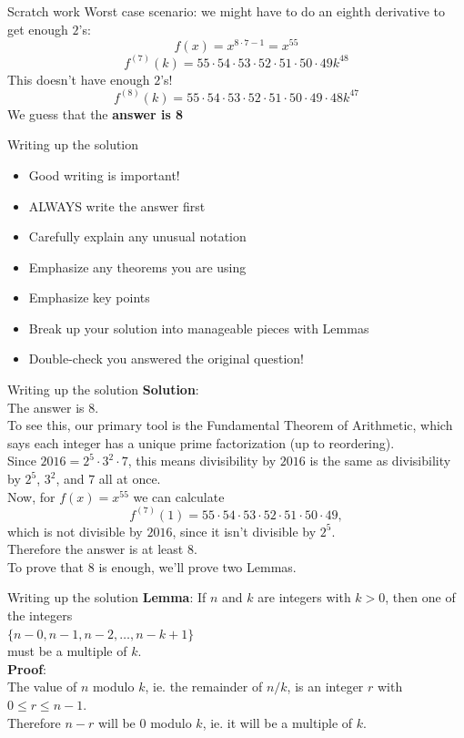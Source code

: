 \documentclass{beamer}
\begin{document}
\begin{frame}{Scratch work}
Worst case scenario: we might have to do an eighth derivative to get enough $2$'s:
\pause
$$f(x) = x^{8\cdot 7-1} = x^{55}$$
\pause
$$f^{(7)}(k) = 55\cdot 54\cdot 53\cdot 52\cdot 51\cdot 50\cdot 49 k^{48}$$
\pause
\hfil This doesn't have enough $2$'s!
\pause
$$f^{(8)}(k) = 55\cdot 54\cdot 53\cdot 52\cdot 51\cdot 50\cdot 49\cdot 48  k^{47}$$
\hfil We guess that the \textbf{answer is 8}
\end{frame}

\begin{frame}{Writing up the solution}
\begin{itemize}
\pause
\item Good writing is important!
\pause
\item ALWAYS write the answer first
\pause
\item Carefully explain any unusual notation
\pause
\item Emphasize any theorems you are using
\pause
\item Emphasize key points
\pause
\item Break up your solution into manageable pieces with Lemmas
\pause
\item Double-check you answered the original question!
\end{itemize}
\end{frame}

\begin{frame}{Writing up the solution}
\textbf{Solution}:\\
\pause
The answer is $8$.\\
\pause
To see this, our primary tool is the Fundamental Theorem of Arithmetic, which says each integer has a unique prime factorization (up to reordering).\\
\pause
Since $2016 = 2^5\cdot 3^2\cdot 7$, this means divisibility by $2016$ is the same as divisibility by $2^5$, $3^2$, and $7$ all at once.\\
\pause
Now, for $f(x) = x^{55}$ we can calculate
$$f^{(7)}(1) = 55\cdot 54\cdot 53\cdot 52\cdot 51\cdot 50\cdot 49,$$
which is not divisible by $2016$, since it isn't divisible by $2^5$.\\
\pause
Therefore the answer is at least $8$.\\
\pause
To prove that $8$ is enough, we'll prove two Lemmas.\\
\end{frame}

\begin{frame}{Writing up the solution}
\textbf{Lemma}: If $n$ and $k$ are integers with $k>0$, then one of the integers\\
\hfil $\{n-0,n-1,n-2,\dots,n-k+1\}$\\
must be a multiple of $k$.\\
\pause
\textbf{Proof}:\\
The value of $n$ modulo $k$, ie. the remainder of $n/k$, is an integer $r$ with $0\leq r \leq n-1$.\\
Therefore $n-r$ will be $0$ modulo $k$, ie. it will be a multiple of $k$.
\end{frame}
\end{document}
